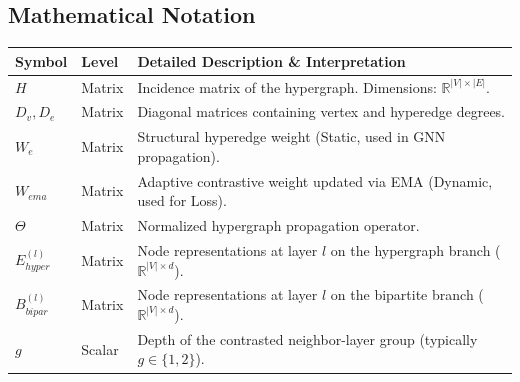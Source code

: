\subsection{Mathematical Notation}
\begin{table}[H]
\centering
\renewcommand{\arraystretch}{1.3}
\small
\begin{tabularx}{\textwidth}{|l|l|L|}
\hline
{}
\textbf{Symbol} & \textbf{Level} & \textbf{Detailed Description \& Interpretation} \\
\hline
$H$ & Matrix & Incidence matrix of the hypergraph. Dimensions: $\mathbb{R}^{|V| \times |E|}$. \\
\hline
$D_v, D_e$ & Matrix & Diagonal matrices containing vertex and hyperedge degrees. \\
\hline
$W_e$ & Matrix & Structural hyperedge weight (Static, used in GNN propagation). \\
\hline
$W_{ema}$ & Matrix & Adaptive contrastive weight updated via EMA (Dynamic, used for Loss). \\
\hline
$\Theta$ & Matrix & Normalized hypergraph propagation operator. \\
\hline
$E_{hyper}^{(l)}$ & Matrix & Node representations at layer $l$ on the hypergraph branch ($\mathbb{R}^{|V| \times d}$). \\
\hline
$B_{bipar}^{(l)}$ & Matrix & Node representations at layer $l$ on the bipartite branch ($\mathbb{R}^{|V| \times d}$). \\
\hline
$g$ & Scalar & Depth of the contrasted neighbor-layer group (typically $g \in \{1, 2\}$). \\
\hline
\end{tabularx}
\end{table}

